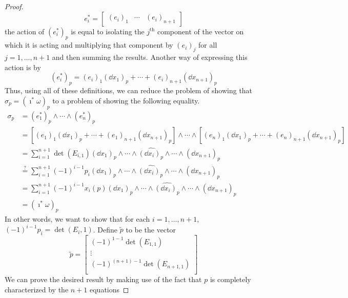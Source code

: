 \documentclass[../psets.tex]{subfiles}
\begin{document}
\begin{enumerate}[label={\textbf{4.4.\roman*.}}]
\begin{proof}
\begin{equation*}
            e_i^* =
            \begin{bmatrix}
                (e_i)_1 & \cdots & (e_i)_{n+1}
            \end{bmatrix}
        \end{equation*}
        the action of $(e_i^*)_p$ is equal to isolating the $j^\text{th}$ component of the vector on which it is acting and multiplying that component by $(e_i)_j$ for all $j=1,\dots,n+1$ and then summing the results. Another way of expressing this action is by
        \begin{equation*}
            (e_i^*)_p = (e_i)_1(\dd{x_1})_p+\cdots+(e_i)_{n+1}(\dd{x_{n+1}})_p
        \end{equation*}
        Thus, using all of these definitions, we can reduce the problem of showing that $\sigma_p=(\imath^*\omega)_p$ to a problem of showing the following equality.
        \begin{align*}
            \sigma_p &= (e_1^*)_p\wedge\cdots\wedge(e_n^*)_p\\
            &= [(e_1)_1(\dd{x_1})_p+\cdots+(e_1)_{n+1}(\dd{x_{n+1}})_p]\wedge\cdots\wedge[(e_n)_1(\dd{x_1})_p+\cdots+(e_n)_{n+1}(\dd{x_{n+1}})_p]\\
            &= \sum_{i=1}^{n+1}\det(E_{i,1})(\dd{x_1})_p\wedge\cdots\wedge\widehat{(\dd{x_i})_p}\wedge\cdots\wedge(\dd{x_{n+1}})_p\\
            &\stackrel{?}{=} \sum_{i=1}^{n+1}(-1)^{i-1}p_i(\dd{x_1})_p\wedge\cdots\wedge\widehat{(\dd{x_i})_p}\wedge\cdots\wedge(\dd{x_{n+1}})_p\\
            &= \sum_{i=1}^{n+1}(-1)^{i-1}x_i(p)(\dd{x_1})_p\wedge\cdots\wedge\widehat{(\dd{x_i})_p}\wedge\cdots\wedge(\dd{x_{n+1}})_p\\
            &= (\imath^*\omega)_p
        \end{align*}
        In other words, we want to show that for each $i=1,\dots,n+1$, $(-1)^{i-1}p_i=\det(E_i,1)$. Define $\tilde{p}$ to be the vector
        \begin{equation*}
            \tilde{p} =
            \begin{bmatrix}
                (-1)^{1-1}\det(E_{1,1})\\
                \vdots\\
                (-1)^{(n+1)-1}\det(E_{n+1,1})\\
            \end{bmatrix}
        \end{equation*}
        We can prove the desired result by making use of the fact that $p$ is completely characterized by the $n+1$ equations

\end{proof}
\end{enumerate}
\end{document}
